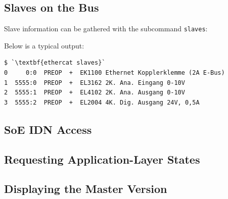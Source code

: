 \documentclass[a4paper,12pt,BCOR=6mm,bibtotoc,idxtotoc]{scrbook}
\begin{document}
\subsection{Slaves on the Bus}

Slave information can be gathered with the subcommand \lstinline+slaves+:



Below is a typical output:

\begin{lstlisting}
$ `\textbf{ethercat slaves}`
0     0:0  PREOP  +  EK1100 Ethernet Kopplerklemme (2A E-Bus)
1  5555:0  PREOP  +  EL3162 2K. Ana. Eingang 0-10V
2  5555:1  PREOP  +  EL4102 2K. Ana. Ausgang 0-10V
3  5555:2  PREOP  +  EL2004 4K. Dig. Ausgang 24V, 0,5A
\end{lstlisting}


\subsection{SoE IDN Access}
\label{sec:soeaccess}






\subsection{Requesting Application-Layer States}




\subsection{Displaying the Master Version}



\end{document}
